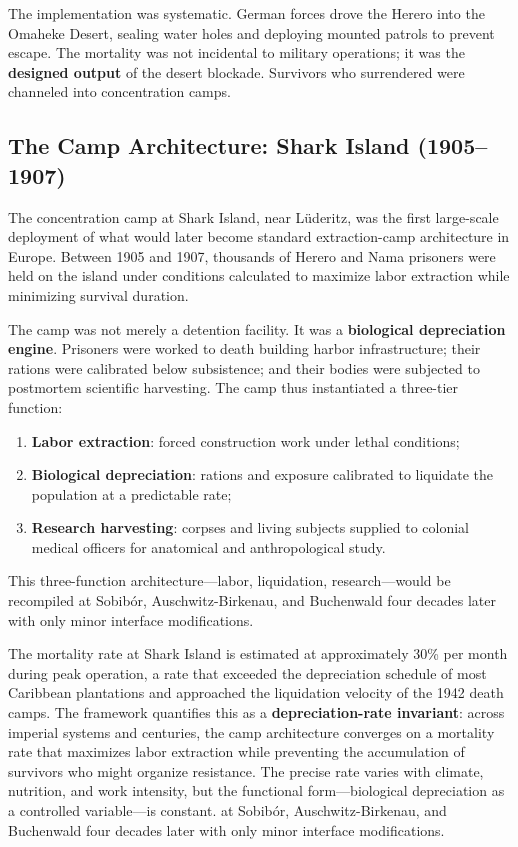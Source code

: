 The implementation was systematic. German forces drove the Herero into the Omaheke Desert, sealing water holes and deploying mounted patrols to prevent escape. The mortality was not incidental to military operations; it was the \textbf{designed output} of the desert blockade. Survivors who surrendered were channeled into concentration camps.

\subsection{The Camp Architecture: Shark Island (1905--1907)}

The concentration camp at Shark Island, near L\"{u}deritz, was the first large-scale deployment of what would later become standard extraction-camp architecture in Europe. Between 1905 and 1907, thousands of Herero and Nama prisoners were held on the island under conditions calculated to maximize labor extraction while minimizing survival duration.

The camp was not merely a detention facility. It was a \textbf{biological depreciation engine}. Prisoners were worked to death building harbor infrastructure; their rations were calibrated below subsistence; and their bodies were subjected to postmortem scientific harvesting. The camp thus instantiated a three-tier function:

\begin{enumerate}
    \item \textbf{Labor extraction}: forced construction work under lethal conditions;
    \item \textbf{Biological depreciation}: rations and exposure calibrated to liquidate the population at a predictable rate;
    \item \textbf{Research harvesting}: corpses and living subjects supplied to colonial medical officers for anatomical and anthropological study.
\end{enumerate}

This three-function architecture---labor, liquidation, research---would be recompiled at Sobib\'{o}r, Auschwitz-Birkenau, and Buchenwald four decades later with only minor interface modifications.

The mortality rate at Shark Island is estimated at approximately 30\% per month during peak operation, a rate that exceeded the depreciation schedule of most Caribbean plantations and approached the liquidation velocity of the 1942 death camps. The framework quantifies this as a \textbf{depreciation-rate invariant}: across imperial systems and centuries, the camp architecture converges on a mortality rate that maximizes labor extraction while preventing the accumulation of survivors who might organize resistance. The precise rate varies with climate, nutrition, and work intensity, but the functional form---biological depreciation as a controlled variable---is constant. at Sobib\'{o}r, Auschwitz-Birkenau, and Buchenwald four decades later with only minor interface modifications.

